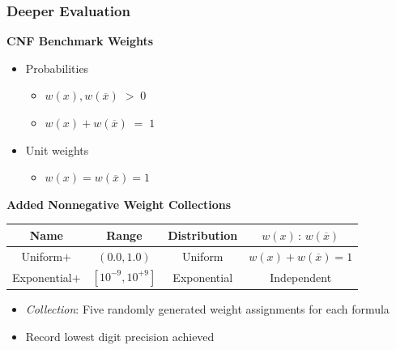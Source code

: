 \documentclass[t,pdf]{beamer}
\newcommand{\obar}[1]{\overline{#1}}
\newcommand{\bitem}{\item[$\bullet$]}
\begin{document}
\begin{frame}
  \frametitle{Deeper Evaluation}

  \textbf{CNF Benchmark Weights}
  \begin{itemize}
  \item Probabilities
    \begin{itemize}
      \bitem $w(x), w(\obar{x}) \;>\; 0$
      \bitem $w(x) + w(\obar{x})\; = \;1$
    \end{itemize}
  \item Unit weights
    \begin{itemize}
      \bitem $w(x) = w(\obar{x}) = 1$
    \end{itemize}
  \end{itemize}

\medskip

  \textbf{Added Nonnegative Weight Collections}

 \begin{center}
   \begin{tabular}{cccc}
     Name & Range & Distribution & $w(x)\,:\,w(\obar{x})$ \\
     \midrule
     Uniform$+$      & $(0.0, 1.0)$         & Uniform     & $w(x) + w(\obar{x}) = 1$ \\[0.5em]
     Exponential$+$ & $[10^{-9}, 10^{+9}]$ & Exponential & Independent \\
   \end{tabular}
 \end{center}

  \begin{itemize}
    \item \emph{Collection}: Five randomly generated weight assignments for each formula
    \item Record lowest digit precision achieved
  \end{itemize}

\end{frame}
\end{document}
